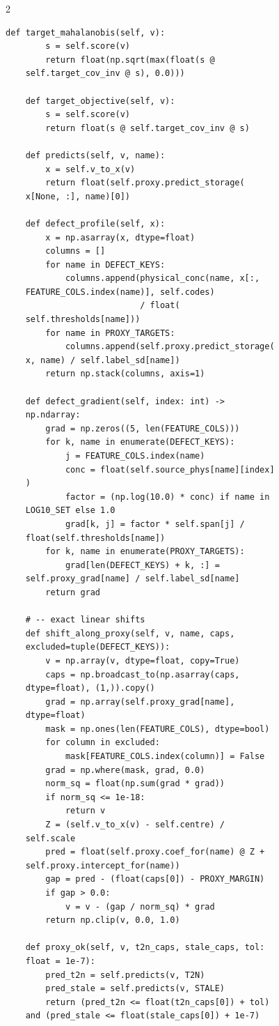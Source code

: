 \begin{multicols}{2}
\begin{Verbatim}[fontsize=\scriptsize]
    def target_mahalanobis(self, v):
        s = self.score(v)
        return float(np.sqrt(max(float(s @
    self.target_cov_inv @ s), 0.0)))

    def target_objective(self, v):
        s = self.score(v)
        return float(s @ self.target_cov_inv @ s)

    def predicts(self, v, name):
        x = self.v_to_x(v)
        return float(self.proxy.predict_storage(
    x[None, :], name)[0])

    def defect_profile(self, x):
        x = np.asarray(x, dtype=float)
        columns = []
        for name in DEFECT_KEYS:
            columns.append(physical_conc(name, x[:,
    FEATURE_COLS.index(name)], self.codes)
                           / float(
    self.thresholds[name]))
        for name in PROXY_TARGETS:
            columns.append(self.proxy.predict_storage(
    x, name) / self.label_sd[name])
        return np.stack(columns, axis=1)

    def defect_gradient(self, index: int) ->
    np.ndarray:
        grad = np.zeros((5, len(FEATURE_COLS)))
        for k, name in enumerate(DEFECT_KEYS):
            j = FEATURE_COLS.index(name)
            conc = float(self.source_phys[name][index]
    )
            factor = (np.log(10.0) * conc) if name in
    LOG10_SET else 1.0
            grad[k, j] = factor * self.span[j] /
    float(self.thresholds[name])
        for k, name in enumerate(PROXY_TARGETS):
            grad[len(DEFECT_KEYS) + k, :] =
    self.proxy_grad[name] / self.label_sd[name]
        return grad

    # -- exact linear shifts
    def shift_along_proxy(self, v, name, caps,
    excluded=tuple(DEFECT_KEYS)):
        v = np.array(v, dtype=float, copy=True)
        caps = np.broadcast_to(np.asarray(caps,
    dtype=float), (1,)).copy()
        grad = np.array(self.proxy_grad[name],
    dtype=float)
        mask = np.ones(len(FEATURE_COLS), dtype=bool)
        for column in excluded:
            mask[FEATURE_COLS.index(column)] = False
        grad = np.where(mask, grad, 0.0)
        norm_sq = float(np.sum(grad * grad))
        if norm_sq <= 1e-18:
            return v
        Z = (self.v_to_x(v) - self.centre) /
    self.scale
        pred = float(self.proxy.coef_for(name) @ Z +
    self.proxy.intercept_for(name))
        gap = pred - (float(caps[0]) - PROXY_MARGIN)
        if gap > 0.0:
            v = v - (gap / norm_sq) * grad
        return np.clip(v, 0.0, 1.0)

    def proxy_ok(self, v, t2n_caps, stale_caps, tol:
    float = 1e-7):
        pred_t2n = self.predicts(v, T2N)
        pred_stale = self.predicts(v, STALE)
        return (pred_t2n <= float(t2n_caps[0]) + tol)
    and (pred_stale <= float(stale_caps[0]) + 1e-7)


\end{Verbatim}
\end{multicols}

